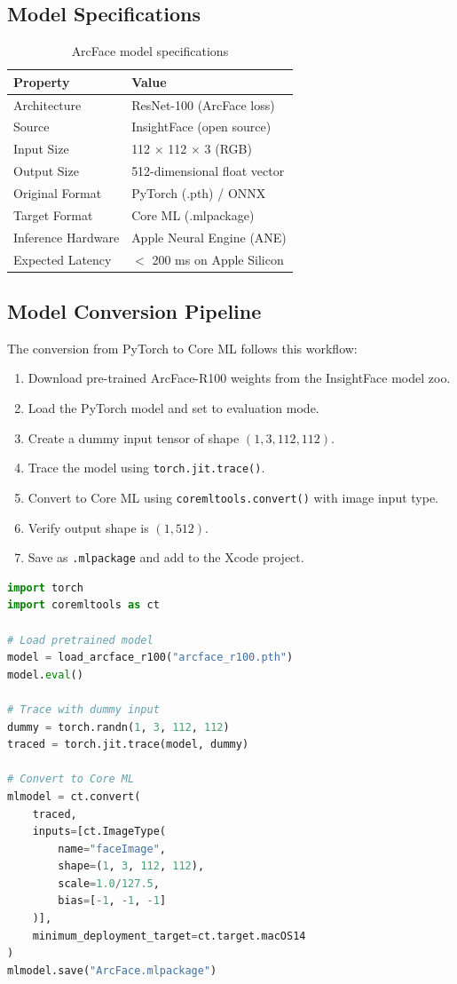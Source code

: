 \documentclass[12pt,a4paper]{report}
\begin{document}
\subsection{Model Specifications}
\begin{table}[H]
\centering
\begin{tabular}{ll}
\toprule
\textbf{Property} & \textbf{Value} \\
\midrule
Architecture & ResNet-100 (ArcFace loss) \\
Source & InsightFace (open source) \\
Input Size & 112 $\times$ 112 $\times$ 3 (RGB) \\
Output Size & 512-dimensional float vector \\
Original Format & PyTorch (.pth) / ONNX \\
Target Format & Core ML (.mlpackage) \\
Inference Hardware & Apple Neural Engine (ANE) \\
Expected Latency & $<$ 200 ms on Apple Silicon \\
\bottomrule
\end{tabular}
\caption{ArcFace model specifications}
\end{table}

\subsection{Model Conversion Pipeline}
The conversion from PyTorch to Core ML follows this workflow:

\begin{enumerate}[noitemsep]
    \item Download pre-trained ArcFace-R100 weights from the InsightFace model zoo.
    \item Load the PyTorch model and set to evaluation mode.
    \item Create a dummy input tensor of shape $(1, 3, 112, 112)$.
    \item Trace the model using \texttt{torch.jit.trace()}.
    \item Convert to Core ML using \texttt{coremltools.convert()} with image input type.
    \item Verify output shape is $(1, 512)$.
    \item Save as \texttt{.mlpackage} and add to the Xcode project.
\end{enumerate}

\begin{lstlisting}[language=Python, caption={ArcFace model conversion script}]
import torch
import coremltools as ct

# Load pretrained model
model = load_arcface_r100("arcface_r100.pth")
model.eval()

# Trace with dummy input
dummy = torch.randn(1, 3, 112, 112)
traced = torch.jit.trace(model, dummy)

# Convert to Core ML
mlmodel = ct.convert(
    traced,
    inputs=[ct.ImageType(
        name="faceImage",
        shape=(1, 3, 112, 112),
        scale=1.0/127.5,
        bias=[-1, -1, -1]
    )],
    minimum_deployment_target=ct.target.macOS14
)
mlmodel.save("ArcFace.mlpackage")
\end{lstlisting}
\end{document}
